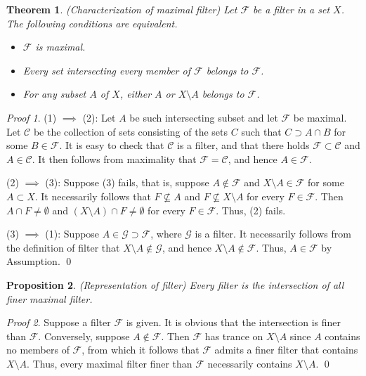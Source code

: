 \documentclass[a4paper,12pt]{article}
\newtheorem{thm}{Theorem}[section]
\newtheorem{prp}[thm]{Proposition}
\theoremstyle{remark}
\newtheorem*{prf}{Proof}
\theoremstyle{definition}
\theoremstyle{definition}
\theoremstyle{definition}
\begin{document}
\begin{thm}\label{characterize maximal filter} (Characterization of maximal filter)
	Let \( \mathscr{F} \) be a filter in a set \( X \). The following conditions are equivalent.
	\begin{itemize}
		\item[(1)] \( \mathscr{F} \) is maximal.
		\item[(2)] Every set intersecting every member of \( \mathscr{F} \) belongs to \( \mathscr{F} \).
		\item[(3)] For any subset \( A \) of \( X \), either \( A \) or \( X \setminus A \) belongs to \( \mathscr{F} \).
	\end{itemize}
\end{thm}
\begin{prf}
	(1) \( \implies \) (2):
	Let \( A \) be such intersecting subset and let \( \mathscr{F} \) be maximal. Let \( \mathscr{C} \) be the collection of sets consisting of the sets \( C \) such that \( C \supset A \cap B \) for some \( B \in \mathscr{F} \). It is easy to check that \( \mathscr{C} \) is a filter, and that there holds \( \mathscr{F} \subset \mathscr{C} \) and \( A \in \mathscr{C} \). It then follows from maximality that \( \mathscr{F} = \mathscr{C} \), and hence \( A \in \mathscr{F} \).

	(2) \( \implies \) (3):
	Suppose (3) fails, that is, suppose \( A \notin \mathscr{F} \) and \( X \setminus A \in \mathscr{F} \) for some \( A \subset X\). It necessarily follows that \( F \nsubseteq A \) and \( F \nsubseteq X \setminus A \) for every \( F \in \mathscr{F} \). Then \( A \cap F \neq \emptyset \) and \( \left( X \setminus A \right) \cap F \neq \emptyset \) for every \( F \in \mathscr{F} \). Thus, (2) fails.

	(3) \( \implies \) (1):
	Suppose \( A \in \mathscr{G} \supset \mathscr{F} \), where \( \mathscr{G} \) is a filter. It necessarily follows from the definition of filter that \( X \setminus A \notin \mathscr{G} \), and hence \( X \setminus A \notin \mathscr{F} \). Thus, \( A \in \mathscr{F} \) by Assumption.
	\qed\end{prf}

\begin{prp} (Representation of filter)
	Every filter is the intersection of all finer maximal filter.
\end{prp}
\begin{prf}
	Suppose a filter \( \mathscr{F} \) is given. It is obvious that the intersection is finer than \( \mathscr{F} \). Conversely, suppose \( A \notin \mathscr{F}\). Then \( \mathscr{F} \) has trance on \( X \setminus A \) since \( A \) contains no members of \( \mathscr{F} \), from which it follows that \( \mathscr{F} \) admits a finer filter that contains \( X \setminus A \). Thus, every maximal filter finer than \( \mathscr{F} \) necessarily contains \( X \setminus A \).
	\qed\end{prf}
\end{document}
